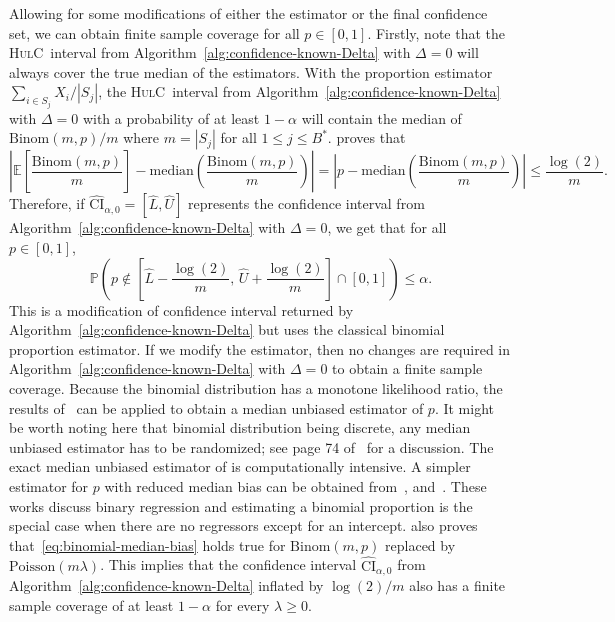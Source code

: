 \documentclass{article}
\newcommand{\hulc}{\textsc{HulC}~}
\numberwithin{myalgctr}{section}
\begin{document}
Allowing for some modifications of either the estimator or the final confidence set, we can obtain finite sample coverage for all $p\in[0, 1]$. Firstly, note that {\color{black}the \hulc interval from} Algorithm~\ref{alg:confidence-known-Delta} with $\Delta = 0$ will always cover the true median of the estimators. With the proportion estimator $\sum_{i\in S_j}X_i/|S_j|$, {\color{black}the \hulc interval from} Algorithm~\ref{alg:confidence-known-Delta} with $\Delta = 0$ with a probability of at least $1 - \alpha$ will contain the median of $\mbox{Binom}(m,p)/m$ where $m = |S_j|$ for all $1\le j\le B^*$. \cite{hamza1995smallest} proves that 
\begin{equation}\label{eq:binomial-median-bias}
\left|\mathbb{E}\left[\frac{\mbox{Binom}(m,p)}{m}\right] - \mbox{median}\left(\frac{\mbox{Binom}(m,p)}{m}\right)\right| = \left|p - \mbox{median}\left(\frac{\mbox{Binom}(m,p)}{m}\right)\right| \le \frac{\log(2)}{m}.
\end{equation}
Therefore, if $\widehat{\mathrm{CI}}_{\alpha,0} = [\widehat{L}, \widehat{U}]$ represents the confidence interval from Algorithm~\ref{alg:confidence-known-Delta} with $\Delta = 0$, we get that for all $p\in[0,1]$,
\[
\mathbb{P}\left(p\notin\left[\widehat{L} - \frac{\log(2)}{m},\,\widehat{U} + \frac{\log(2)}{m}\right]\cap[0,1]\right) \le \alpha.
\] 
This is a modification of confidence interval returned by Algorithm~\ref{alg:confidence-known-Delta} but uses the classical binomial proportion estimator. If we modify the estimator, then no changes are required in Algorithm~\ref{alg:confidence-known-Delta} with $\Delta = 0$ to obtain a finite sample coverage. Because the binomial distribution has a monotone likelihood ratio, the results of~\cite{pfanzagl1970median,pfanzagl1972median} can be applied to obtain a median unbiased estimator of $p$. It might be worth noting here that binomial distribution being discrete, any median unbiased estimator has to be randomized; see page 74 of~\cite{pfanzagl2011parametric} for a discussion. The exact median unbiased estimator of \citet{pfanzagl1970median,pfanzagl1972median} is computationally intensive. A simpler estimator for $p$ with reduced median bias can be obtained from~\cite{hirji1989median}, and~\cite{kenne2017median}. These works discuss binary regression and estimating a binomial proportion is the special case when there are no regressors except for an intercept.
\cite{hamza1995smallest} also proves that~\eqref{eq:binomial-median-bias} holds true for $\mbox{Binom}(m,p)$ replaced by $\mbox{Poisson}(m\lambda)$. This implies that the confidence interval $\widehat{\mathrm{CI}}_{\alpha,0}$ from Algorithm~\ref{alg:confidence-known-Delta} inflated by $\log(2)/m$ also has a finite sample coverage {\color{black}of at least $1-\alpha$} for every $\lambda \ge 0$. 
\end{document}
